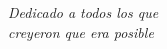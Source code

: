 \chapter*{}
\begin{flushright}
\textit{Dedicado a todos los que  \\
  creyeron que era posible}
\end{flushright}
